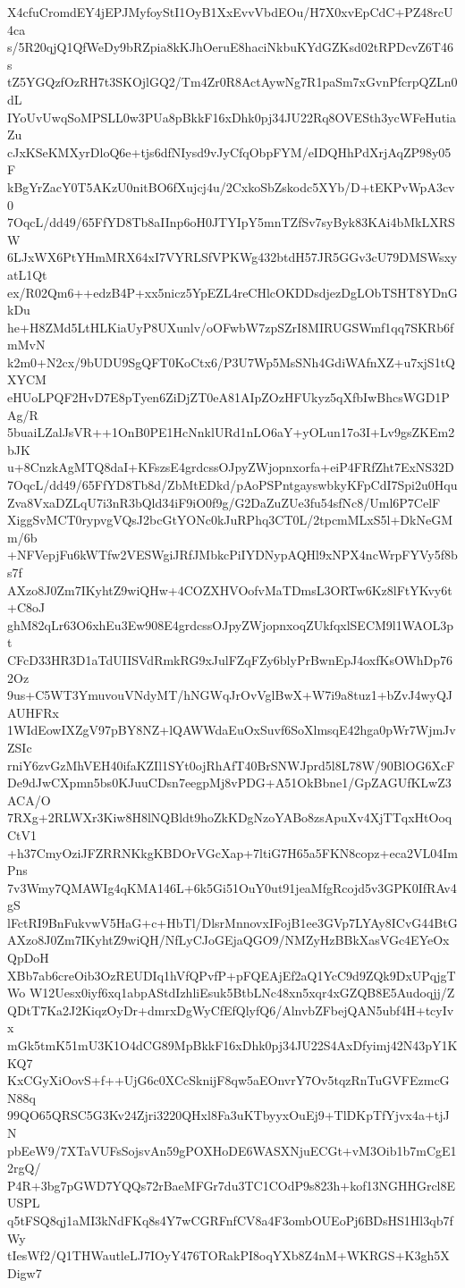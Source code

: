 X4cfuCromdEY4jEPJMyfoyStI1OyB1XxEvvVbdEOu/H7X0xvEpCdC+PZ48rcU4ca
s/5R20qjQ1QfWeDy9bRZpia8kKJhOeruE8haciNkbuKYdGZKsd02tRPDcvZ6T46s
tZ5YGQzfOzRH7t3SKOjlGQ2/Tm4Zr0R8ActAywNg7R1paSm7xGvnPfcrpQZLn0dL
IYoUvUwqSoMPSLL0w3PUa8pBkkF16xDhk0pj34JU22Rq8OVESth3ycWFeHutiaZu
cJxKSeKMXyrDloQ6e+tjs6dfNIysd9vJyCfqObpFYM/eIDQHhPdXrjAqZP98y05F
kBgYrZacY0T5AKzU0nitBO6fXujcj4u/2CxkoSbZskodc5XYb/D+tEKPvWpA3cv0
7OqcL/dd49/65FfYD8Tb8aIInp6oH0JTYIpY5mnTZfSv7syByk83KAi4bMkLXRSW
6LJxWX6PtYHmMRX64xI7VYRLSfVPKWg432btdH57JR5GGv3cU79DMSWsxyatL1Qt
ex/R02Qm6++edzB4P+xx5nicz5YpEZL4reCHlcOKDDsdjezDgLObTSHT8YDnGkDu
he+H8ZMd5LtHLKiaUyP8UXunlv/oOFwbW7zpSZrI8MIRUGSWmf1qq7SKRb6fmMvN
k2m0+N2cx/9bUDU9SgQFT0KoCtx6/P3U7Wp5MsSNh4GdiWAfnXZ+u7xjS1tQXYCM
eHUoLPQF2HvD7E8pTyen6ZiDjZT0eA81AIpZOzHFUkyz5qXfbIwBhcsWGD1PAg/R
5buaiLZalJsVR++1OnB0PE1HcNnklURd1nLO6aY+yOLun17o3I+Lv9gsZKEm2bJK
u+8CnzkAgMTQ8daI+KFszsE4grdcssOJpyZWjopnxorfa+eiP4FRfZht7ExNS32D
7OqcL/dd49/65FfYD8Tb8d/ZbMtEDkd/pAoPSPntgayswbkyKFpCdI7Spi2u0Hqu
Zva8VxaDZLqU7i3nR3bQld34iF9iO0f9g/G2DaZuZUe3fu54sfNc8/Uml6P7CelF
XiggSvMCT0rypvgVQsJ2bcGtYONc0kJuRPhq3CT0L/2tpcmMLxS5l+DkNeGMm/6b
+NFVepjFu6kWTfw2VESWgiJRfJMbkcPiIYDNypAQHl9xNPX4ncWrpFYVy5f8bs7f
AXzo8J0Zm7IKyhtZ9wiQHw+4COZXHVOofvMaTDmsL3ORTw6Kz8lFtYKvy6t+C8oJ
ghM82qLr63O6xhEu3Ew908E4grdcssOJpyZWjopnxoqZUkfqxlSECM9l1WAOL3pt
CFcD33HR3D1aTdUIISVdRmkRG9xJulFZqFZy6blyPrBwnEpJ4oxfKsOWhDp762Oz
9us+C5WT3YmuvouVNdyMT/hNGWqJrOvVglBwX+W7i9a8tuz1+bZvJ4wyQJAUHFRx
1WIdEowIXZgV97pBY8NZ+lQAWWdaEuOxSuvf6SoXlmsqE42hga0pWr7WjmJvZSIc
rniY6zvGzMhVEH40ifaKZIl1SYt0ojRhAfT40BrSNWJprd5l8L78W/90BlOG6XcF
De9dJwCXpmn5bs0KJuuCDsn7eegpMj8vPDG+A51OkBbne1/GpZAGUfKLwZ3ACA/O
7RXg+2RLWXr3Kiw8H8lNQBldt9hoZkKDgNzoYABo8zsApuXv4XjTTqxHtOoqCtV1
+h37CmyOziJFZRRNKkgKBDOrVGcXap+7ltiG7H65a5FKN8copz+eca2VL04ImPns
7v3Wmy7QMAWIg4qKMA146L+6k5Gi51OuY0ut91jeaMfgRcojd5v3GPK0IfRAv4gS
lFctRI9BnFukvwV5HaG+c+HbTl/DlsrMnnovxIFojB1ee3GVp7LYAy8ICvG44BtG
AXzo8J0Zm7IKyhtZ9wiQH/NfLyCJoGEjaQGO9/NMZyHzBBkXasVGc4EYeOxQpDoH
XBb7ab6creOib3OzREUDIq1hVfQPvfP+pFQEAjEf2aQ1YcC9d9ZQk9DxUPqjgTWo
W12Uesx0iyf6xq1abpAStdIzhliEsuk5BtbLNc48xn5xqr4xGZQB8E5Audoqjj/Z
QDtT7Ka2J2KiqzOyDr+dmrxDgWyCfEfQlyfQ6/AlnvbZFbejQAN5ubf4H+tcyIvx
mGk5tmK51mU3K1O4dCG89MpBkkF16xDhk0pj34JU22S4AxDfyimj42N43pY1KKQ7
KxCGyXiOovS+f++UjG6c0XCcSknijF8qw5aEOnvrY7Ov5tqzRnTuGVFEzmcGN88q
99QO65QRSC5G3Kv24Zjri3220QHxl8Fa3uKTbyyxOuEj9+TlDKpTfYjvx4a+tjJN
pbEeW9/7XTaVUFsSojsvAn59gPOXHoDE6WASXNjuECGt+vM3Oib1b7mCgE12rgQ/
P4R+3bg7pGWD7YQQs72rBaeMFGr7du3TC1COdP9s823h+kof13NGHHGrcl8EUSPL
q5tFSQ8qj1aMI3kNdFKq8s4Y7wCGRFnfCV8a4F3ombOUEoPj6BDsHS1Hl3qb7fWy
tIesWf2/Q1THWautleLJ7IOyY476TORakPI8oqYXb8Z4nM+WKRGS+K3gh5XDigw7
